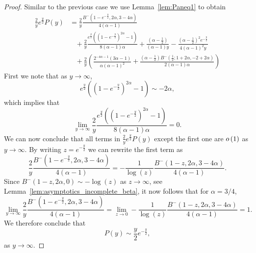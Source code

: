 \begin{proof}
Similar to the previous case we use Lemma~\ref{lem:Paneq1} to obtain
\begin{align*}
	\frac{2}{y} e^{\frac{y}{2}}P(y) 
	&= \frac{2}{y}\frac{B^-(1-e^{-\frac{y}{2}}, 2\alpha, 3 - 4\alpha)}{4(\alpha - 1)}\\
	&\hspace{10pt} + \frac{2}{y}\frac{e^{\frac{y}{2}}\left((1 - e^{-\frac{y}{2}})^{2\alpha} - 1\right)}{8(\alpha - 1)\alpha}
		+ \frac{(\alpha - \frac{1}{2})}{(\alpha - 1)y} 
		-\frac{(\alpha - \frac{1}{2})^2 e^{-\frac{y}{2}}}{4(\alpha - 1)^2 y} \\
	&\hspace{10pt}+ \frac{2}{y} 
		\left(\frac{2^{-4 \alpha-1} (3 \alpha - 1)}{\alpha (\alpha - 1)^2} 
		+ \frac{(\alpha - \frac{1}{2}) B^-(\frac{1}{2}; 1 + 2 \alpha, -2 + 2 \alpha)}{2(\alpha - 1) \alpha} \right)
\end{align*}
First we note that as $y \to \infty$,
\begin{equation}\label{eq:asymptotics_Delta_P_auxiliary}
	e^{\frac{y}{2}}\left(\left(1 - e^{-\frac{y}{2}}\right)^{2\alpha}-1\right) 
	\sim -2\alpha,
\end{equation}
which implies that
\[
	\lim_{y \to \infty} \frac{2}{y}\frac{e^{\frac{y}{2}}\left((1 - e^{-\frac{y}{2}})^{2\alpha} - 1\right)}{8(\alpha - 1)\alpha} = 0.
\]
We can now conclude that all terms in $\frac{2}{y} e^{\frac{y}{2}}P(y)$ except the first one are $o\left(1\right)$ as $y \to \infty$. By writing $z = e^{-\frac{y}{2}}$ we can rewrite the first term as
\[
	\frac{2}{y}\frac{B^-(1-e^{-\frac{y}{2}}, 2\alpha, 3 - 4\alpha)}{4(\alpha - 1)} 
	= -\frac{1}{\log(z)}\frac{B^-(1-z, 2\alpha, 3 - 4\alpha)}{4(\alpha - 1)}.
\]
Since $B^-(1-z,2\alpha,0) \sim - \log(z)$ as $z \to \infty$, see Lemma~\ref{lem:asymptotics_incomplete_beta}, it now follows
that for $\alpha = 3/4$,
\[
	\lim_{y \to \infty} \frac{2}{y}\frac{B^-(1-e^{-\frac{y}{2}}, 2\alpha, 3 - 4\alpha)}{4(\alpha - 1)}
	= \lim_{z \to 0} -\frac{1}{\log(z)}\frac{B^-(1-z, 2\alpha, 3 - 4\alpha)}{4(\alpha - 1)} = 1.
\]
We therefore conclude that
\[
	P(y) \sim \frac{y}{2} e^{-\frac{y}{2}},
\]
as $y \to \infty$.


\end{proof}

